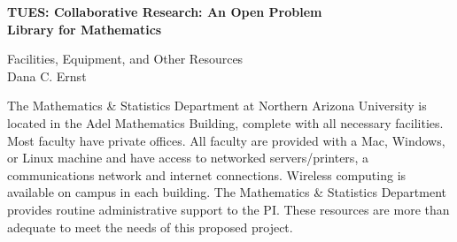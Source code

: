 \documentclass[11pt]{article}
\begin{document}
\begin{center}
{\Large \textbf{TUES: Collaborative Research: An Open Problem\\
Library for Mathematics}}

\bigskip

{\Large Facilities, Equipment, and Other Resources}\\
\smallskip
Dana C. Ernst
\end{center}

\thispagestyle{empty}

\noindent The Mathematics \& Statistics Department at Northern Arizona University is located in the Adel Mathematics Building, complete with all necessary facilities. Most faculty have private offices.  All faculty are provided with a Mac, Windows, or Linux machine and have access to networked servers/printers, a communications network and internet connections.  Wireless computing is available on campus in each building.  The Mathematics \& Statistics Department provides routine administrative support to the PI.  These resources are more than adequate to meet the needs of this proposed project.
\end{document}
